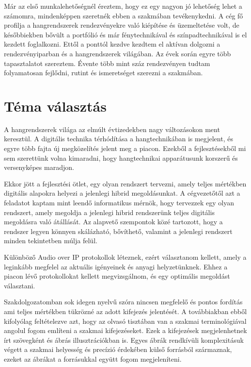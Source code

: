 Már az első munkalehetőségnél éreztem, hogy ez egy nagyon jó lehetőség lehet a számomra, mindenképpen szeretnék ebben a szakmában tevékenykedni.
A cég fő profilja a hangrendszerek rendezvényekre való kiépítése és üzemeltetése volt, de későbbiekben bővült a portfólió és már fénytechnikával és színpadtechnikával is el kezdett foglalkozni. 
Ettől a ponttól kezdve kezdtem el aktívan dolgozni a rendezvényiparban és a hangrendszerek világában. Az évek során egyre több tapasztalatot szereztem.
Évente több mint száz rendezvényen tudtam folyamatosan fejlődni, rutint és ismeretséget szerezni a szakmában.

\section{Téma választás}

A hangrendszerek világa az elmúlt évtizedekben nagy változásokon ment keresztül.
A digitális technika térhódítása a hangtechnikában is megjelent, és egyre több fajta új megközelítés jelent meg a piacon.
Ezekből a fejlesztésekből mi sem szerettünk volna kimaradni, hogy hangtechnikai apparátusunk korszerű és versenyképes maradjon.

Ekkor jött a fejlesztési ötlet, egy olyan rendszert tervezni, amely teljes mértékben digitális alapokra helyezi a jelenlegi hibrid megoldásunkat.
A cégvezetőtől azt a feladatot kaptam mint leendő informatikus mérnök, hogy tervezzek egy olyan rendszert,
amely megoldja a jelenlegi hibrid rendszerünk teljes digitális megoldásra való átállását.
Az alapvető szempontok közé tartozott, hogy a rendszer legyen könnyen skálázható, bővíthető, valamint a jelenlegi rendszert minden tekintetben múlja felül.

Különböző Audio over IP protokollok léteznek, ezért választanom kellett, amely a leginkább megfelel az aktuális igényeinek és anyagi helyzetünknek.
Ehhez a piacon lévő protokollokat kellett megvizsgálnom, és egy optimális megoldást választani.

Szakdolgozatomban sok idegen nyelvű szóra nincsen megfelelő és pontos fordítás ami teljes mértékben tükrözné az adott kifejezés jelentését.
A továbbiakban ebből kifolyólag feltételezve azt, hogy az olvasó tisztában van a szakmai terminológiával angolul fogom említeni a szakmai kifejezéseket.
Ezek a kifejezések megjelenhetnek írt szövegként és ábrás illusztrációkban is. Egyes ábrák rendkívüli komplexitásuk végett a szakmai helyesség és precízió érdekében
külső forrásból származnak, ezeket az ábrákat a forrásukkal együtt fogom megjeleníteni.
